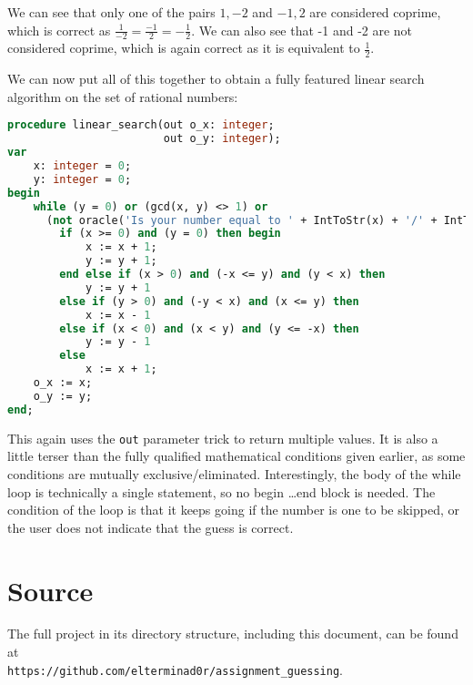 \documentclass{article}
\begin{document}
    We can see that only one of the pairs $1, -2$ and $-1, 2$ are considered
    coprime, which is correct as $\frac{1}{-2} = \frac{-1}{2} = -\frac{1}{2}$.
    We can also see that -1 and -2 are not considered coprime, which is again
    correct as it is equivalent to $\frac{1}{2}$.

    We can now put all of this together to obtain a fully featured linear
    search algorithm on the set of rational numbers:

\begin{lstlisting}[language=Pascal, caption=Linear search on $\mathbb{Q}$ implementation in Pascal]
procedure linear_search(out o_x: integer;
                        out o_y: integer);
var
    x: integer = 0;
    y: integer = 0;
begin
    while (y = 0) or (gcd(x, y) <> 1) or
      (not oracle('Is your number equal to ' + IntToStr(x) + '/' + IntToStr(y) + '? ')) do
        if (x >= 0) and (y = 0) then begin
            x := x + 1;
            y := y + 1;
        end else if (x > 0) and (-x <= y) and (y < x) then
            y := y + 1
        else if (y > 0) and (-y < x) and (x <= y) then
            x := x - 1
        else if (x < 0) and (x < y) and (y <= -x) then
            y := y - 1
        else
            x := x + 1;
    o_x := x;
    o_y := y;
end;
\end{lstlisting}
    
    This again uses the \verb|out| parameter trick to return multiple values.
    It is also a little terser than the fully qualified mathematical conditions
    given earlier, as some conditions are mutually exclusive/eliminated.
    Interestingly, the body of the while loop is technically a single
    statement, so no begin \ldots end block is needed. The condition of the
    loop is that it keeps going if the number is one to be skipped, or the user
    does not indicate that the guess is correct.

    \section{Source}
    The full project in its directory structure, including this document, can
    be found at\\ \verb|https://github.com/elterminad0r/assignment_guessing|.
\end{document}
